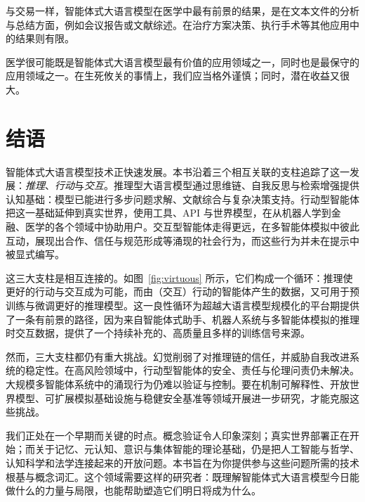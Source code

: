 与交易一样，智能体式大语言模型在医学中最有前景的结果，是在文本文件的分析与总结方面，例如会议报告或文献综述。在治疗方案决策、执行手术等其他应用中的结果则有限。

医学很可能既是智能体式大语言模型最有价值的应用领域之一，同时也是最保守的应用领域之一。在生死攸关的事情上，我们应当格外谨慎；同时，潜在收益又很大。
\section{结语}

智能体式大语言模型技术正快速发展。本书沿着三个相互关联的支柱追踪了这一发展：\emph{推理}、\emph{行动}与\emph{交互}。推理型大语言模型通过思维链、自我反思与检索增强提供认知基础：模型已能进行多步问题求解、文献综合与复杂决策支持。行动型智能体把这一基础延伸到真实世界，使用工具、API 与世界模型，在从机器人学到金融、医学的各个领域中协助用户。交互型智能体走得更远，在多智能体模拟中彼此互动，展现出合作、信任与规范形成等涌现的社会行为，而这些行为并未在提示中被显式编写。

这三大支柱是相互连接的。如图~\ref{fig:virtuous} 所示，它们构成一个循环：推理使更好的行动与交互成为可能，而由（交互）行动的智能体产生的数据，又可用于预训练与微调更好的推理模型。这一良性循环为超越大语言模型规模化的平台期提供了一条有前景的路径，因为来自智能体式助手、机器人系统与多智能体模拟的推理时交互数据，提供了一个持续补充的、高质量且多样的训练信号来源。

然而，三大支柱都仍有重大挑战。幻觉削弱了对推理链的信任，并威胁自我改进系统的稳定性。在高风险领域中，行动型智能体的安全、责任与伦理问责仍未解决。大规模多智能体系统中的涌现行为仍难以验证与控制。要在机制可解释性、开放世界模型、可扩展模拟基础设施与稳健安全基准等领域开展进一步研究，才能克服这些挑战。
 
我们正处在一个早期而关键的时点。概念验证令人印象深刻；真实世界部署正在开始；而关于记忆、元认知、意识与集体智能的理论基础，仍是把人工智能与哲学、认知科学和法学连接起来的开放问题。本书旨在为你提供参与这些问题所需的技术根基与概念词汇。这个领域需要这样的研究者：既理解智能体式大语言模型今日能做什么的力量与局限，也能帮助塑造它们明日将成为什么。

